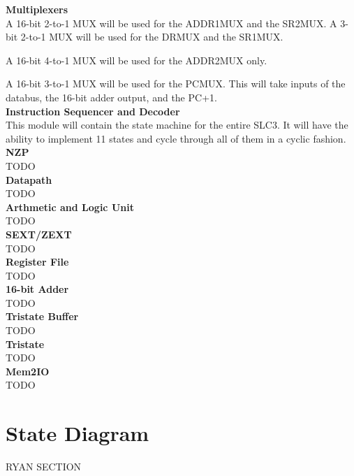 \documentclass[journal, twocolumn, final,11pt,letterpaper]{IEEEtran}
\begin{document}
\normalsize\textbf{Multiplexers} \\
A 16-bit 2-to-1 MUX will be used for the ADDR1MUX and the SR2MUX. A 3-bit 2-to-1 MUX will be used for the DRMUX and the SR1MUX.

A 16-bit 4-to-1 MUX will be used for the ADDR2MUX only.

A 16-bit 3-to-1 MUX will be used for the PCMUX. This will take inputs of the databus, the 16-bit adder output, and the PC+1. \\

\normalsize\textbf{Instruction Sequencer and Decoder } \\
This module will contain the state machine for the entire SLC3. It will have the ability to implement 11 states and cycle through all of them in a cyclic fashion. \\

\normalsize\textbf{NZP} \\
TODO \\

\normalsize\textbf{Datapath} \\
TODO \\

\normalsize\textbf{Arthmetic and Logic Unit} \\
TODO \\

\normalsize\textbf{SEXT/ZEXT} \\
TODO \\

\normalsize\textbf{Register File} \\
TODO \\

\normalsize\textbf{16-bit Adder} \\
TODO \\

\normalsize\textbf{Tristate Buffer} \\
TODO \\

\normalsize\textbf{Tristate} \\
TODO \\

\normalsize\textbf{Mem2IO} \\
TODO \\




\section{State Diagram}
RYAN SECTION 
\end{document}
